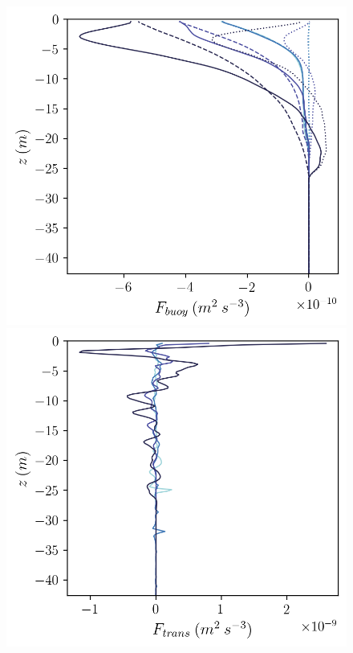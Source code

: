 \documentclass[draft]{styles/agujournal2019}
\begin{document}
\begin{figure}
\begin{minipage}{0.33\textwidth}
    \end{minipage}
    \newline
    \begin{minipage}{0.33\textwidth}
        \includegraphics[trim={0 0 0 0},clip,width=\textwidth]{Figures/Fbuoy_cmp_dslope_43h_tav13h_z_profile.png}
    \end{minipage}%
    \begin{minipage}{0.33\textwidth}
        \includegraphics[trim={0 0 0 0},clip,width=\textwidth]{Figures/Ftrans_cmp_dslope_43h_tav13h_z_profile.png}

\end{minipage}
\end{figure}
\end{document}
